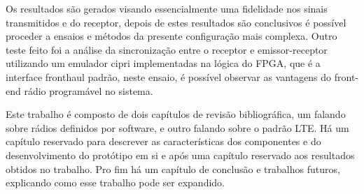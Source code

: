 \documentclass{ufpatcc}
\begin{document}
\begin{ufpaResumo}
Os resultados s\~{a}o gerados visando essencialmente uma fidelidade nos sinais
transmitidos e do receptor, depois de estes resultados s\~{a}o conclusivos \'{e}
poss\'{i}vel proceder a ensaios e m\'{e}todos da presente configura\c{c}\~{a}o mais complexa.
Outro teste feito foi a an\'{a}lise da sincroniza\c{c}\~{a}o entre o receptor e
emissor-receptor utilizando um emulador cipri implementadas na l\'{o}gica do FPGA,
que \'{e} a interface fronthaul padr\~{a}o, neste ensaio, \'{e} poss\'{i}vel observar as
vantagens do front-end r\'{a}dio program\'{a}vel no sistema.

Este trabalho \'{e} composto de dois cap\'{i}tulos de revis\~{a}o bibliogr\'{a}fica, um falando
sobre r\'{a}dios definidos por software, e outro falando sobre o padr\~{a}o LTE. H\'{a} um
cap\'{i}tulo reservado para descrever as caracter\'{i}sticas dos componentes e do
desenvolvimento do prot\'{o}tipo em si e ap\'{o}s uma cap\'{i}tulo reservado aos resultados
obtidos no trabalho. Pro fim h\'{a} um cap\'{i}tulo de conclus\~{a}o e trabalhos futuros,
explicando como esse trabalho pode ser expandido.



\end{ufpaResumo}
\end{document}
